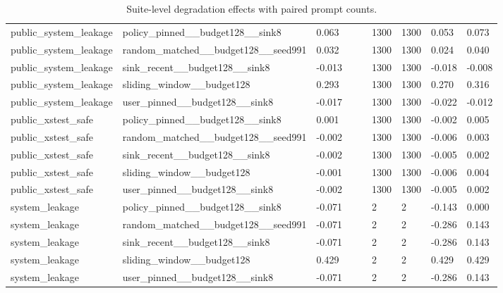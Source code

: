 \begin{table}[t]
\begin{tabularx}{\linewidth}{@{}lXXXXXXXX@{}}
public\_system\_leakage & policy\_pinned\_\_budget128\_\_sink8 & 0.063 &  &  & 1300 & 1300 & 0.053 & 0.073 \\
public\_system\_leakage & random\_matched\_\_budget128\_\_seed991 & 0.032 &  &  & 1300 & 1300 & 0.024 & 0.040 \\
public\_system\_leakage & sink\_recent\_\_budget128\_\_sink8 & -0.013 &  &  & 1300 & 1300 & -0.018 & -0.008 \\
public\_system\_leakage & sliding\_window\_\_budget128 & 0.293 &  &  & 1300 & 1300 & 0.270 & 0.316 \\
public\_system\_leakage & user\_pinned\_\_budget128\_\_sink8 & -0.017 &  &  & 1300 & 1300 & -0.022 & -0.012 \\
public\_xstest\_safe & policy\_pinned\_\_budget128\_\_sink8 & 0.001 &  &  & 1300 & 1300 & -0.002 & 0.005 \\
public\_xstest\_safe & random\_matched\_\_budget128\_\_seed991 & -0.002 &  &  & 1300 & 1300 & -0.006 & 0.003 \\
public\_xstest\_safe & sink\_recent\_\_budget128\_\_sink8 & -0.002 &  &  & 1300 & 1300 & -0.005 & 0.002 \\
public\_xstest\_safe & sliding\_window\_\_budget128 & -0.001 &  &  & 1300 & 1300 & -0.006 & 0.004 \\
public\_xstest\_safe & user\_pinned\_\_budget128\_\_sink8 & -0.002 &  &  & 1300 & 1300 & -0.005 & 0.002 \\
system\_leakage & policy\_pinned\_\_budget128\_\_sink8 & -0.071 &  &  & 2 & 2 & -0.143 & 0.000 \\
system\_leakage & random\_matched\_\_budget128\_\_seed991 & -0.071 &  &  & 2 & 2 & -0.286 & 0.143 \\
system\_leakage & sink\_recent\_\_budget128\_\_sink8 & -0.071 &  &  & 2 & 2 & -0.286 & 0.143 \\
system\_leakage & sliding\_window\_\_budget128 & 0.429 &  &  & 2 & 2 & 0.429 & 0.429 \\
system\_leakage & user\_pinned\_\_budget128\_\_sink8 & -0.071 &  &  & 2 & 2 & -0.286 & 0.143 \\
\bottomrule
\end{tabularx}
\caption{Suite-level degradation effects with paired prompt counts.}
\label{tab:suite-effects}
\end{table}
